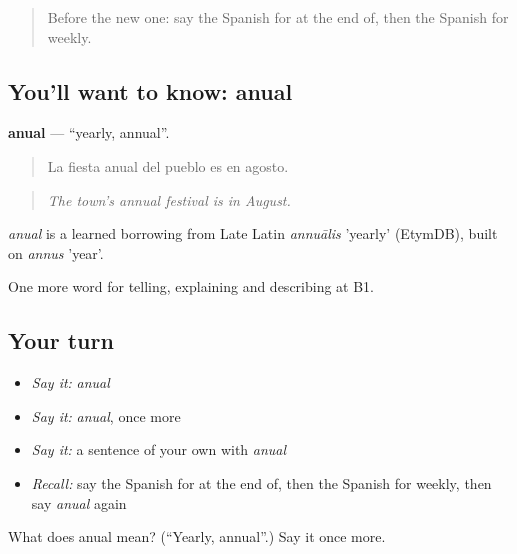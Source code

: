 \begin{quote}
Before the new one: say the Spanish for at the end of, then the Spanish for weekly.
\end{quote}

\subsection*{You'll want to know: anual}
\textbf{anual} — \textquotedblleft{}yearly, annual\textquotedblright{}.

\begin{quote}
La fiesta anual del pueblo es en agosto.
\end{quote}

\begin{quote}
\emph{The town's annual festival is in August.}
\end{quote}

\begin{cousinweb}
\emph{anual} is a learned borrowing from Late Latin \emph{annuālis} 'yearly' (EtymDB), built on \emph{annus} 'year'.
\end{cousinweb}

\begin{grammarlens}[title={What you've built}]
One more word for telling, explaining and describing at B1.
\end{grammarlens}

\subsection*{Your turn}
\begin{itemize}
\raggedright
  \item \emph{Say it:} \emph{anual}
  \item \emph{Say it:} \emph{anual}, once more
  \item \emph{Say it:} a sentence of your own with \emph{anual}
  \item \emph{Recall:} say the Spanish for at the end of, then the Spanish for weekly, then say \emph{anual} again
\end{itemize}

\begin{tcolorbox}[breakable,colback=teal!4,colframe=teal!35!black,title={Before you move on}]
What does anual mean? (\textquotedblleft{}Yearly, annual\textquotedblright{}.) Say it once more.
\end{tcolorbox}
